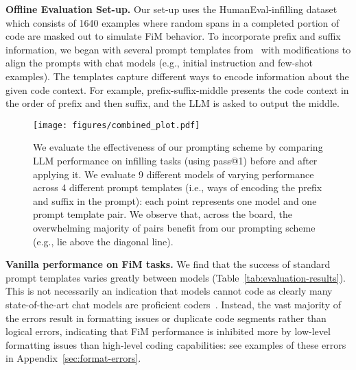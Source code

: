 \textbf{Offline Evaluation Set-up.} 
Our set-up uses the HumanEval-infilling dataset~\citep{bavarian2022efficient} which consists of 1640 examples where random spans in a completed portion of code are masked out to simulate FiM behavior.
To incorporate prefix and suffix information, we began with several prompt templates from~\citet{gong2024evaluation} with modifications to align the prompts with chat models (e.g., initial instruction and few-shot examples).
The templates capture different ways to encode information about the given code context. 
For example, prefix-suffix-middle presents the code context in the order of prefix and then suffix, and the LLM is asked to output the middle.

\begin{figure}[t]
\centering
\texttt{[image: figures/combined\_plot.pdf]}
\caption{We evaluate the effectiveness of our prompting scheme by comparing LLM performance on infilling tasks (using pass@1) before and after applying it. We evaluate 9 different models of varying performance across 4 different prompt templates (i.e., ways of encoding the prefix and suffix in the prompt): each point represents one model and one prompt template pair. We observe that, across the board, the overwhelming majority of pairs 
benefit from our prompting scheme (e.g., lie above the diagonal line).
}
\label{fig:prompt_results}
\end{figure}

\textbf{Vanilla performance on FiM tasks.} 
We find that the success of standard prompt templates varies greatly between models (Table~\ref{tab:evaluation-results}).
This is not necessarily an indication that models cannot code as clearly many state-of-the-art chat models are proficient coders~\citep{jain2024livecodebench, lin2024wildbench}.
Instead, the vast majority of the errors result in formatting issues or duplicate code segments rather than logical errors, indicating that FiM performance is inhibited more by low-level formatting issues than high-level coding capabilities: see examples of these errors in Appendix~\ref{sec:format-errors}.

